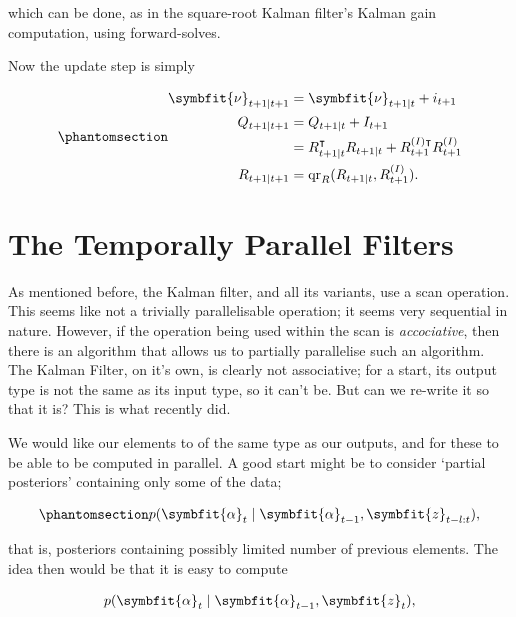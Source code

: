 \documentclass[
]{report}
\newcommand{\bv}[1]{\symbfit{#1}}
\theoremstyle{plain}
\theoremstyle{plain}
\theoremstyle{remark}
\begin{document}
which can be done, as in the square-root Kalman filter's Kalman gain
computation, using forward-solves.

Now the update step is simply

\begin{equation}\phantomsection\label{eq-sqrtinfup}{\begin{split}
  \bv\nu_{t+1\mid t+1} &= \bv\nu_{t+1\mid t} + i_{t+1}\\
  Q_{t+1\mid t+1} &= Q_{t+1\mid t} + I_{t+1}\\
  &= R_{t+1\mid t}^\intercal R_{t+1\mid t} + R^{(I)\intercal}_{t+1}R^{(I)}_{t+1}\\
  R_{t+1\mid t+1}  &= \mathrm{qr}_R(R_{t+1\mid t}, R^{(I)}_{t+1}). 
\end{split}
}\end{equation}

\section{The Temporally Parallel
Filters}\label{the-temporally-parallel-filters}

As mentioned before, the Kalman filter, and all its variants, use a scan
operation. This seems like not a trivially parallelisable operation; it
seems very sequential in nature. However, if the operation being used
within the scan is \emph{accociative}, then there is an algorithm that
allows us to partially parallelise such an algorithm. The Kalman Filter,
on it's own, is clearly not associative; for a start, its output type is
not the same as its input type, so it can't be. But can we re-write it
so that it is? This is what \cite{sarkka2020temporal} recently did.

We would like our elements to of the same type as our outputs, and for
these to be able to be computed in parallel. A good start might be to
consider `partial posteriors' containing only some of the data;

\begin{equation}\phantomsection\label{eq-ass-elt}{\begin{split}
  p(\bv\alpha_t \mid \bv\alpha_{t-1}, \bv z_{t-l:t}),
\end{split}
}\end{equation}

that is, posteriors containing possibly limited number of previous
elements. The idea then would be that it is easy to compute

\[\begin{split}
  p(\bv\alpha_t \mid \bv\alpha_{t-1}, \bv z_t),
\end{split}
\]
\end{document}
